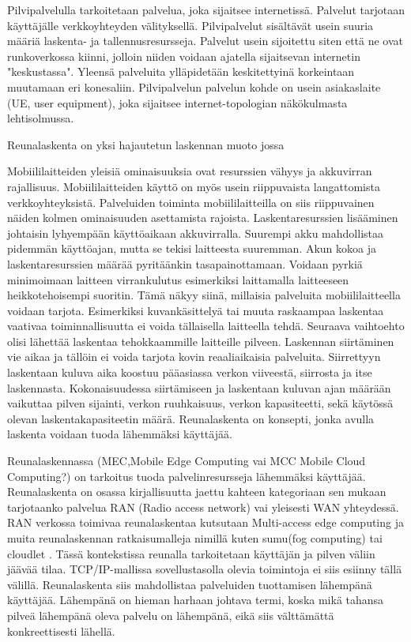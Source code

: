 \documentclass[finnish]{tktltiki2}
\theoremstyle{definition}
\theoremstyle{remark}
\begin{document}
Pilvipalvelulla tarkoitetaan palvelua, joka sijaitsee internetissä. Palvelut tarjotaan käyttäjälle verkkoyhteyden välityksellä.
Pilvipalvelut sisältävät usein suuria määriä laskenta- ja tallennusresursseja. Palvelut usein sijoitettu siten että ne ovat runkoverkossa kiinni, jolloin niiden voidaan ajatella sijaitsevan internetin "keskustassa".
Yleensä palveluita ylläpidetään keskitettyinä korkeintaan muutamaan eri konesaliin.
Pilvipalvelun palvelun kohde on usein asiakaslaite (UE, user equipment), joka sijaitsee internet-topologian näkökulmasta lehtisolmussa.

Reunalaskenta on yksi hajautetun laskennan muoto jossa 

Mobiililaitteiden yleisiä ominaisuuksia ovat resurssien vähyys ja akkuvirran rajallisuus. Mobiililaitteiden käyttö on myös usein riippuvaista langattomista verkkoyhteyksistä.
Palveluiden toiminta mobiililaitteilla on siis riippuvainen näiden kolmen ominaisuuden asettamista rajoista.
Laskentaresurssien lisääminen johtaisin lyhyempään käyttöaikaan akkuvirralla. Suurempi akku mahdollistaa pidemmän käyttöajan, mutta se tekisi laitteesta suuremman. Akun kokoa ja laskentaresurssien määrää pyritäänkin tasapainottamaan.
Voidaan pyrkiä minimoimaan laitteen virrankulutus esimerkiksi laittamalla laitteeseen heikkotehoisempi suoritin. Tämä näkyy siinä, millaisia palveluita mobiililaitteella voidaan tarjota.
Esimerkiksi kuvankäsittelyä tai muuta raskaampaa laskentaa vaativaa toiminnallisuutta ei voida tällaisella laitteella tehdä. 
Seuraava vaihtoehto olisi lähettää laskentaa tehokkaammille laitteille pilveen. Laskennan siirtäminen vie aikaa ja tällöin ei voida tarjota kovin reaaliaikaisia palveluita.
Siirrettyyn laskentaan kuluva aika koostuu pääasiassa verkon viiveestä, siirrosta ja itse laskennasta. 
Kokonaisuudessa siirtämiseen ja laskentaan kuluvan ajan määrään vaikuttaa pilven sijainti, verkon ruuhkaisuus, verkon kapasiteetti, sekä käytössä olevan laskentakapasiteetin määrä.
Reunalaskenta on konsepti, jonka avulla laskenta voidaan tuoda lähemmäksi käyttäjää.

Reunalaskennassa (MEC,Mobile Edge Computing vai MCC Mobile Cloud Computing?) on tarkoitus tuoda palvelinresursseja lähemmäksi käyttäjää. Reunalaskenta on osassa kirjallisuutta jaettu kahteen kategoriaan sen mukaan tarjotaanko palvelua RAN (Radio access network) vai yleisesti WAN yhteydessä. RAN verkossa toimivaa reunalaskentaa kutsutaan Multi-access edge computing ja muita reunalaskennan ratkaisumalleja  nimillä kuten sumu(fog computing) tai cloudlet\cite{taleb2017multi} .
Tässä kontekstissa reunalla tarkoitetaan käyttäjän ja pilven väliin jäävää tilaa. TCP/IP-mallissa sovellustasolla olevia toimintoja ei siis esiinny tällä välillä.
Reunalaskenta siis mahdollistaa palveluiden tuottamisen lähempänä käyttäjää. Lähempänä on hieman harhaan johtava termi, koska mikä tahansa pilveä lähempänä oleva palvelu on lähempänä, eikä siis välttämättä konkreettisesti lähellä. 
\end{document}

